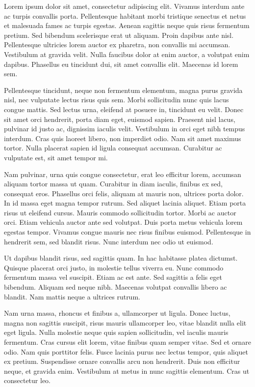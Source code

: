 Lorem ipsum dolor sit amet, consectetur adipiscing elit.
Vivamus interdum ante ac turpis convallis porta.
Pellentesque habitant morbi tristique senectus et netus et malesuada fames ac turpis egestas.
Aenean sagittis neque quis risus fermentum pretium.
Sed bibendum scelerisque erat ut aliquam.
Proin dapibus ante nisl.
Pellentesque ultricies lorem auctor ex pharetra, non convallis mi accumsan.
Vestibulum at gravida velit.
Nulla faucibus dolor at enim auctor, a volutpat enim dapibus.
Phasellus eu tincidunt dui, sit amet convallis elit.
Maecenas id lorem sem.

Pellentesque tincidunt, neque non fermentum elementum, magna purus gravida nisl, nec vulputate lectus risus quis sem.
Morbi sollicitudin nunc quis lacus congue mattis.
Sed lectus urna, eleifend at posuere in, tincidunt eu velit.
Donec sit amet orci hendrerit, porta diam eget, euismod sapien.
Praesent nisl lacus, pulvinar id justo ac, dignissim iaculis velit.
Vestibulum in orci eget nibh tempus interdum.
Cras quis laoreet libero, non imperdiet odio.
Nam sit amet maximus tortor.
Nulla placerat sapien id ligula consequat accumsan.
Curabitur ac vulputate est, sit amet tempor mi.

Nam pulvinar, urna quis congue consectetur, erat leo efficitur lorem, accumsan aliquam tortor massa ut quam.
Curabitur in diam iaculis, finibus ex sed, consequat eros.
Phasellus orci felis, aliquam at mauris non, ultrices porta dolor.
In id massa eget magna tempor rutrum.
Sed aliquet lacinia aliquet.
Etiam porta risus ut eleifend cursus.
Mauris commodo sollicitudin tortor.
Morbi ac auctor orci.
Etiam vehicula auctor ante sed volutpat.
Duis porta metus vehicula lorem egestas tempor.
Vivamus congue mauris nec risus finibus euismod.
Pellentesque in hendrerit sem, sed blandit risus.
Nunc interdum nec odio ut euismod.

Ut dapibus blandit risus, sed sagittis quam.
In hac habitasse platea dictumst.
Quisque placerat orci justo, in molestie tellus viverra eu.
Nunc commodo fermentum massa vel suscipit.
Etiam ac est ante.
Sed sagittis a felis eget bibendum.
Aliquam sed neque nibh.
Maecenas volutpat convallis libero ac blandit.
Nam mattis neque a ultrices rutrum.

Nam urna massa, rhoncus et finibus a, ullamcorper ut ligula.
Donec luctus, magna non sagittis suscipit, risus mauris ullamcorper leo, vitae blandit nulla elit eget ligula.
Nulla molestie neque quis sapien sollicitudin, vel iaculis mauris fermentum.
Cras cursus elit lorem, vitae finibus quam semper vitae.
Sed et ornare odio.
Nam quis porttitor felis.
Fusce lacinia purus nec lectus tempor, quis aliquet ex pretium.
Suspendisse ornare convallis arcu non hendrerit.
Duis non efficitur neque, et gravida enim.
Vestibulum at metus in nunc sagittis elementum.
Cras ut consectetur leo.

